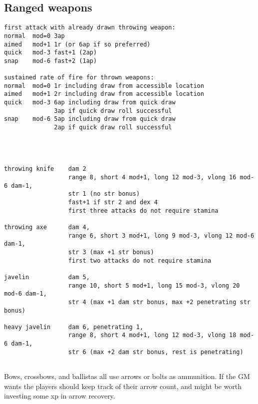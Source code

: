 \subsection*{Ranged weapons}
\small
\begin{verbatim}
first attack with already drawn throwing weapon:
normal  mod=0 3ap
aimed   mod+1 1r (or 6ap if so preferred)
quick   mod-3 fast+1 (2ap)
snap    mod-6 fast+2 (1ap)

sustained rate of fire for thrown weapons:
normal  mod=0 1r including draw from accessible location
aimed   mod+1 2r including draw from accessible location
quick   mod-3 6ap including draw from quick draw
              3ap if quick draw roll successful
snap    mod-6 5ap including draw from quick draw
              2ap if quick draw roll successful




throwing knife    dam 2
                  range 8, short 4 mod+1, long 12 mod-3, vlong 16 mod-6 dam-1,
                  str 1 (no str bonus)
                  fast+1 if str 2 and dex 4
                  first three attacks do not require stamina

throwing axe      dam 4,
                  range 6, short 3 mod+1, long 9 mod-3, vlong 12 mod-6 dam-1,
                  str 3 (max +1 str bonus)
                  first two attacks do not require stamina

javelin           dam 5,
                  range 10, short 5 mod+1, long 15 mod-3, vlong 20 mod-6 dam-1,
                  str 4 (max +1 dam str bonus, max +2 penetrating str bonus)

heavy javelin     dam 6, penetrating 1,
                  range 8, short 4 mod+1, long 12 mod-3, vlong 18 mod-6 dam-1,
                  str 6 (max +2 dam str bonus, rest is penetrating)


\end{verbatim} \pagebreak[3] \normalsize
Bows, crossbows, and ballistas all use arrows or bolts as ammunition.
If the GM wants the players should keep track of their arrow count, and might be worth investing some xp in arrow recovery.
